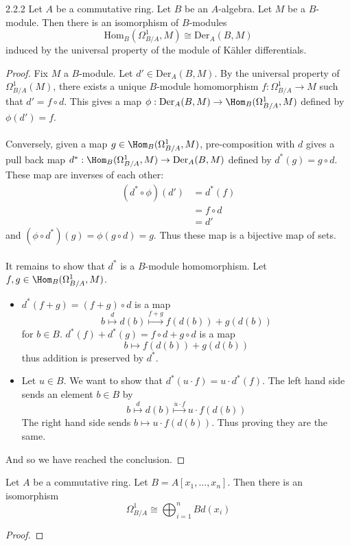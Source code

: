 \documentclass[a4paper]{article}
\begin{document}
\begin{lmm}{}{2.2.2} Let $A$ be a commutative ring. Let $B$ be an $A$-algebra. Let $M$ be a $B$-module. Then there is an isomorphism of $B$-modules $$\text{Hom}_B(\Omega_{B/A}^1,M)\cong\text{Der}_A(B,M)$$ induced by the universal property of the module of Kähler differentials. 
\begin{proof}
Fix $M$ a $B$-module. Let $d'\in\text{Der}_A(B,M)$. By the universal property of $\Omega_{B/A}^1(M)$, there exists a unique $B$-module homomorphism $f:\Omega_{B/A}^1\to M$ such that $d'=f\circ d$. This gives a map $\phi:\text{Der}_A(B,M)\to\Hom_B(\Omega_{B/A}^1,M)$ defined by $\phi(d')=f$. \\~\\
Conversely, given a map $g\in\Hom_B(\Omega_{B/A}^1,M)$, pre-composition with $d$ gives a pull back map $d^\ast:\Hom_B(\Omega_{B/A}^1,M)\to\text{Der}_A(B,M)$ defined by $d^\ast(g)=g\circ d$. These map are inverses of each other: 
\begin{align*}
(d^\ast\circ\phi)(d')&=d^\ast(f)\\
&=f\circ d\\
&=d'\tag{By universal property}
\end{align*} and 
$(\phi\circ d^\ast)(g)=\phi(g\circ d)=g$. 
Thus these map is a bijective map of sets. \\~\\

It remains to show that $d^\ast$ is a $B$-module homomorphism. Let $f,g\in\Hom_B(\Omega_{B/A}^1,M)$. 
\begin{itemize}
\item $d^\ast(f+g)=(f+g)\circ d$ is a map $$b\overset{d}{\mapsto}d(b)\overset{f+g}{\mapsto}f(d(b))+g(d(b))$$ for $b\in B$. $d^\ast(f)+d^\ast(g)=f\circ d+g\circ d$ is a map $$b\mapsto f(d(b))+g(d(b))$$ thus addition is preserved by $d^\ast$. 
\item Let $u\in B$. We want to show that $d^\ast(u\cdot f)=u\cdot d^\ast(f)$. The left hand side sends an element $b\in B$ by $$b\overset{d}{\mapsto}d(b)\overset{u\cdot f}{\mapsto}u\cdot f(d(b))$$ The right hand side sends $b\mapsto u\cdot f(d(b))$. Thus proving they are the same. 
\end{itemize}
And so we have reached the conclusion. 
\end{proof}
\end{lmm}

\begin{eg}{}{} Let $A$ be a commutative ring. Let $B=A[x_1,\dots,x_n]$. Then there is an isomorphism $$\Omega_{B/A}^1\cong\bigoplus_{i=1}^nBd(x_i)$$
\begin{proof}

\end{proof}
\end{eg}
\end{document}
